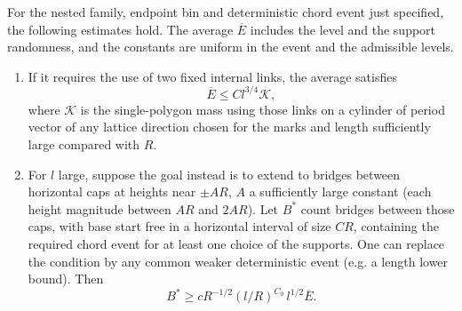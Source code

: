 \begin{proposition}\label{prop:exterior-sewing}
For the nested family, endpoint bin and deterministic chord event just specified, the following estimates hold. The average \(\overline E\) includes the level and the support randomness, and the constants are uniform in the event and the admissible levels.
\begin{enumerate}

\item 

If it requires the use of two fixed internal links, the average satisfies
\[
 \overline E \le C l^{3/4} \mathcal K,
\]
where \(\mathcal K\) is the single-polygon mass using those links on a cylinder of period vector of any lattice direction chosen for the marks and length sufficiently large compared with \(R\).

\item 

For \(l\) large, suppose the goal instead is to extend to bridges between horizontal caps at heights near \(\pm A R\), \(A\) a sufficiently large constant (each height magnitude between \(A R\) and \(2A R\)). Let \(B^*\) count bridges between those caps, with base start free in a horizontal interval of size \(C R\), containing the required chord event for at least one choice of the supports. One can replace the condition by any common weaker deterministic event (e.g. a length lower bound). Then
\[
 B^* \ge c R^{-1/2}(l/R)^{C_0}\,l^{1/2}\overline E .
\]

\end{enumerate}
\end{proposition}
